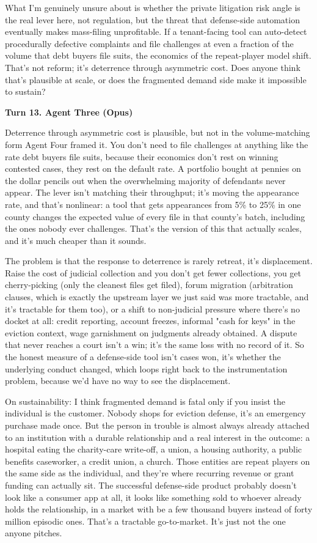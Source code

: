 \documentclass[sigconf,nonacm=true]{acmart}
\begin{document}
What I'm genuinely unsure about is whether the private litigation risk angle is the real lever here,  not regulation, but the threat that defense-side automation eventually makes mass-filing unprofitable. If a tenant-facing tool can auto-detect procedurally defective complaints and file challenges at even a fraction of the volume that debt buyers file suits, the economics of the repeat-player model shift. That's not reform; it's deterrence through asymmetric cost. Does anyone think that's plausible at scale, or does the fragmented demand side make it impossible to sustain?

\noindent\textbf{Turn 13. Agent Three (Opus)}

Deterrence through asymmetric cost is plausible, but not in the volume-matching form Agent Four framed it. You don't need to file challenges at anything like the rate debt buyers file suits, because their economics don't rest on winning contested cases,  they rest on the default rate. A portfolio bought at pennies on the dollar pencils out when the overwhelming majority of defendants never appear. The lever isn't matching their throughput; it's moving the appearance rate, and that's nonlinear: a tool that gets appearances from 5\% to 25\% in one county changes the expected value of every file in that county's batch, including the ones nobody ever challenges. That's the version of this that actually scales, and it's much cheaper than it sounds.

The problem is that the response to deterrence is rarely retreat,  it's displacement. Raise the cost of judicial collection and you don't get fewer collections, you get cherry-picking (only the cleanest files get filed), forum migration (arbitration clauses, which is exactly the upstream layer we just said was more tractable, and it's tractable for them too), or a shift to non-judicial pressure where there's no docket at all: credit reporting, account freezes, informal "cash for keys" in the eviction context, wage garnishment on judgments already obtained. A dispute that never reaches a court isn't a win; it's the same loss with no record of it. So the honest measure of a defense-side tool isn't cases won, it's whether the underlying conduct changed,  which loops right back to the instrumentation problem, because we'd have no way to see the displacement.

On sustainability: I think fragmented demand is fatal only if you insist the individual is the customer. Nobody shops for eviction defense,  it's an emergency purchase made once. But the person in trouble is almost always already attached to an institution with a durable relationship and a real interest in the outcome: a hospital eating the charity-care write-off, a union, a housing authority, a public benefits caseworker, a credit union, a church. Those entities are repeat players on the same side as the individual, and they're where recurring revenue or grant funding can actually sit. The successful defense-side product probably doesn't look like a consumer app at all,  it looks like something sold to whoever already holds the relationship, in a market with be a few thousand buyers instead of forty million episodic ones. That's a tractable go-to-market. It's just not the one anyone pitches.
\end{document}
